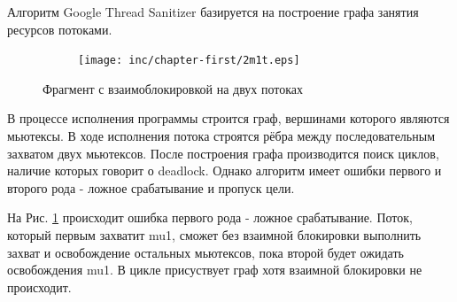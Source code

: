 Алгоритм Google Thread Sanitizer базируется на построение графа занятия ресурсов потоками.

\begin{figure}[htbp]
    \centering
    \begin{subfigure}[h]{0.4\textwidth}
        \centering
        
    \end{subfigure}
    \hfill
    \begin{subfigure}[h]{0.4\textwidth}
        \centering
        \texttt{[image: inc/chapter-first/2m1t.eps]}
    \end{subfigure}
    \caption{Фрагмент с взаимоблокировкой на двух потоках}
    \label{fig:2m2t-d}
\end{figure}

В процессе исполнения программы строится граф, вершинами которого являются мьютексы. В ходе исполнения потока строятся рёбра между последовательным захватом двух мьютексов. После построения графа производится поиск циклов, наличие которых говорит о deadlock. Однако алгоритм имеет ошибки первого и второго рода - ложное срабатывание и пропуск цели.

На Рис. \ref{fig:2m2t-d} происходит ошибка первого рода - ложное срабатывание. Поток, который первым захватит mu1, сможет без взаимной блокировки выполнить захват и освобождение остальных мьютексов, пока второй будет ожидать освобождения mu1. В цикле присуствует граф хотя взаимной блокировки не происходит.

